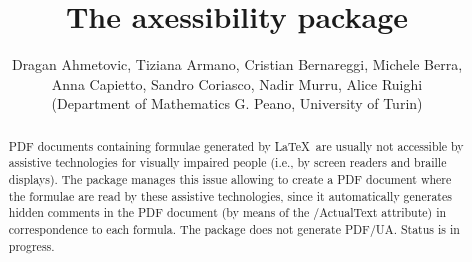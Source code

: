 \documentclass[11pt,a4paper]{article}
\title{The \textbf{axessibility} package}
\author{Dragan Ahmetovic, Tiziana Armano, Cristian Bernareggi, Michele Berra, \\
 Anna Capietto, Sandro Coriasco, Nadir Murru, Alice Ruighi\\
(Department of Mathematics G. Peano, University of Turin)}
\begin{document}
\maketitle

\begin{abstract}
PDF documents containing formulae generated by \LaTeX\ are usually not accessible by assistive technologies for visually impaired people (i.e., by screen readers and braille displays). The package manages this issue allowing to create a PDF document where the formulae are read by these assistive technologies, since it automatically generates hidden comments in the PDF document (by means of the /ActualText attribute) in correspondence to each formula. The package does not generate PDF/UA. Status is in progress.
\end{abstract}

\tableofcontents

\end{document}
